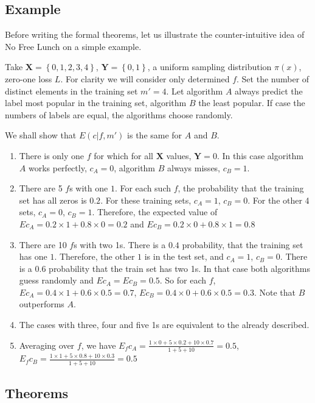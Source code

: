 \documentclass[a4paper]{article}
\begin{document}
\subsection{Example}
Before writing the formal theorems, let us illustrate the
counter-intuitive idea of No Free Lunch on a simple example.

Take $\mathbf{X} = \left\{0,1,2,3,4\right\}$,
$\mathbf{Y} = \left\{0,1\right\}$, a uniform sampling distribution
$\pi(x)$, zero-one loss $L$. For clarity we will consider only
determined $f$. Set the number of distinct elements in the training set
$m' = 4$. Let algorithm $A$ always predict the label most popular in
the training set, algorithm $B$ the least popular. If case the numbers
of labels are equal, the algorithms choose randomly.

We shall show that $E(c|f,m')$ is the same for $A$ and $B$.
\begin{enumerate}
\item There is only one $f$ for which for all $\mathbf{X}$ values,
  $\mathbf{Y}=0$. In this case algorithm $A$ works perfectly, $c_A=0$,
  algorithm $B$ always misses, $c_B=1$.
\item There are 5 $f$s with one $1$. For each such $f$, the
  probability that the training set has all zeros is $0.2$. For these
  training sets, $c_A=1$, $c_B=0$. For the other 4 sets, $c_A=0$,
  $c_B=1$. Therefore, the expected value of
  $E c_A = 0.2\times 1 + 0.8 \times 0 = 0.2$ and
  $E c_B = 0.2\times 0 + 0.8 \times 1 = 0.8$
\item There are 10 $f$s with two 1s. There is a $0.4$ probability,
  that the training set has one $1$. Therefore, the other $1$ is in
  the test set, and $c_A = 1$, $c_B = 0$. There is a $0.6$ probability
  that the train set has two 1s. In that case both algorithms guess
  randomly and $E c_A = E c_B = 0.5$. So for each $f$,
  $E c_A = 0.4\times 1 + 0.6\times 0.5 = 0.7$,
  $E c_B = 0.4\times 0 + 0.6\times 0.5 = 0.3$. Note that $B$
  outperforms $A$.
\item The cases with three, four and five 1s are equivalent to the
  already described.
\item Averaging over $f$, we have
  $E_f c_A = \frac{1\times 0 + 5\times 0.2 + 10\times 0.7}{1+5+10} =
  0.5$,
  $E_f c_B = \frac{1\times 1 + 5\times 0.8 + 10\times 0.3}{1+5+10} =
  0.5$
\end{enumerate}

\subsection{Theorems}
\end{document}
